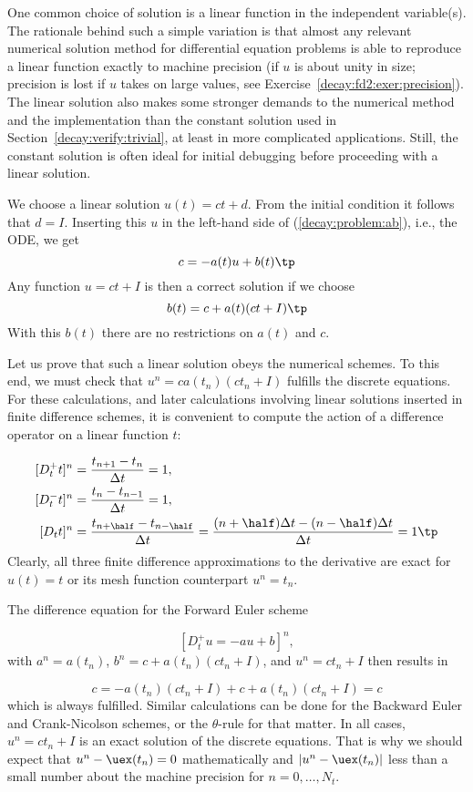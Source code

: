 \documentclass[graybox,sectrefs,envcountresetchap,open=right,final]{svmonodo}
\begin{document}
One common choice of solution is a linear function in the independent
variable(s). The rationale behind such a simple variation is that
almost any relevant numerical solution method for differential
equation problems is able to reproduce a linear function exactly to
machine precision (if $u$ is about unity in size; precision is lost if
$u$ takes on large values, see Exercise~\ref{decay:fd2:exer:precision}).
The linear solution also makes some stronger demands to the
numerical method and the implementation than the constant solution
used in Section~\ref{decay:verify:trivial}, at least in more
complicated applications. Still, the constant solution is often
ideal for initial debugging before proceeding with a linear solution.

We choose a linear solution $u(t) = ct + d$. From the initial condition it
follows that $d=I$.
Inserting this $u$ in the left-hand side of (\ref{decay:problem:ab}), i.e.,
the ODE, we get
\[ c = -a(t)u + b(t) \tp  \]
Any function $u=ct+I$ is then a correct solution if we choose
\[ b(t) = c + a(t)(ct + I) \tp  \]
With this $b(t)$ there are no restrictions on $a(t)$ and $c$.

Let us prove that such a linear solution obeys the numerical
schemes. To this end, we must check that $u^n = ca(t_n)(ct_n+I)$
fulfills the discrete equations. For these calculations, and
later calculations involving linear solutions inserted in
finite difference schemes, it is convenient to
compute the action of a difference operator on a linear function $t$:

\begin{align}
\lbrack D_t^+ t\rbrack^n &= \frac{t_{n+1}-t_n}{\Delta t}=1,
\label{decay:fd2:Dop:tn:fw}\\ 
\lbrack D_t^- t\rbrack^n &= \frac{t_{n}-t_{n-1}}{\Delta t}=1,
\label{decay:fd2:Dop:tn:bw}\\ 
\lbrack D_t t\rbrack^n &= \frac{t_{n+\half}-t_{n-\half}}{\Delta t}=\frac{(n+\half)\Delta t - (n-\half)\Delta t}{\Delta t}=1
\label{decay:fd2:Dop:tn:cn}
\tp
\end{align}
Clearly, all three finite difference approximations to the derivative are
exact for $u(t)=t$ or its mesh function counterpart $u^n = t_n$.

The difference equation for the Forward Euler scheme

\[ [D^+_t u = -au + b]^n, \]
with $a^n=a(t_n)$, $b^n=c + a(t_n)(ct_n + I)$, and $u^n=ct_n + I$
then results in

\[ c = -a(t_n)(ct_n+I) + c + a(t_n)(ct_n + I) = c \]
which is always fulfilled. Similar calculations can be done for the
Backward Euler and Crank-Nicolson schemes, or the $\theta$-rule for
that matter. In all cases, $u^n=ct_n +I$ is an exact solution of
the discrete equations. That is why we should expect that
$u^n - \uex(t_n) =0$ mathematically and $|u^n - \uex(t_n)|$ less
than a small number about the machine precision for $n=0,\ldots,N_t$.
\end{document}
